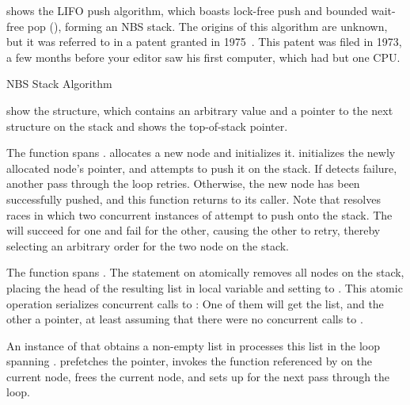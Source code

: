 \begin{fcvref}
shows the LIFO push algorithm, which boasts lock-free push and
bounded wait-free pop (), forming an NBS stack.
The origins of this algorithm are unknown, but it was referred to in
a patent granted in 1975~\cite{PaulJBrown1975LIFOpush}.
This patent was filed in 1973, a few months before your editor
saw his first computer, which had but one CPU\@.

\begin{listing}[tbp]

\caption{NBS Stack Algorithm}
\label{lst:advsync:NBS Stack Algorithm}
\end{listing}

 show the  structure,
which contains an arbitrary value and a pointer to the next structure
on the stack and
 shows the top-of-stack pointer.

The  function spans .
 allocates a new node and
 initializes it.
 initializes the newly allocated node's 
pointer, and  attempts to push it on the stack.
If  detects  failure, another pass
through the loop retries.
Otherwise, the new node has been successfully pushed, and this function
returns to its caller.
Note that  resolves races in which two concurrent
instances of  attempt to push onto the stack.
The  will succeed for one and fail for the other,
causing the other to retry, thereby selecting an arbitrary order for
the two node on the stack.

The  function spans .
The  statement on  atomically removes
all nodes on the stack, placing the head of the resulting list in local
variable  and setting  to .
This atomic operation serializes concurrent calls to :
One of them will get the list, and the other a  pointer, at
least assuming that there were no concurrent calls to .

An instance of  that obtains a non-empty list in
 processes this list in the loop spanning
.
 prefetches the  pointer,
 invokes the function referenced by  on the
current node,
 frees the current node, and
 sets up  for the next pass through the loop.


\end{fcvref}
